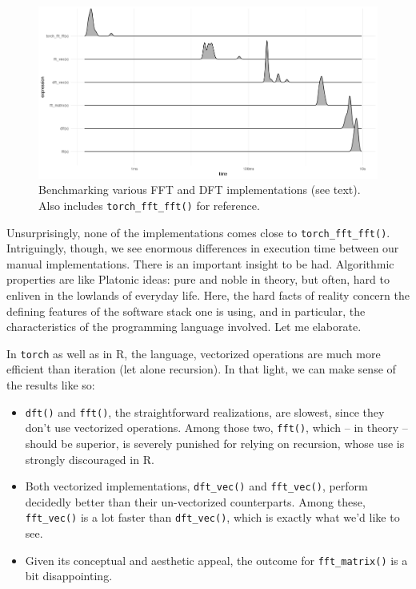 \documentclass[
  letterpaper,
]{krantz}
\providecommand{\tightlist}{%
  \setlength{\itemsep}{0pt}\setlength{\parskip}{0pt}}\usepackage{longtable,booktabs,array}
\begin{document}
\begin{figure}[H]

{\centering \includegraphics{images/fft-perf.png}

}

\caption{\label{fig-fft-perf}Benchmarking various FFT and DFT
implementations (see text). Also includes \texttt{torch\_fft\_fft()} for
reference.}

\end{figure}

Unsurprisingly, none of the implementations comes close to
\texttt{torch\_fft\_fft()}. Intriguingly, though, we see enormous
differences in execution time between our manual implementations. There
is an important insight to be had. Algorithmic properties are like
Platonic ideas: pure and noble in theory, but often, hard to enliven in
the lowlands of everyday life. Here, the hard facts of reality concern
the defining features of the software stack one is using, and in
particular, the characteristics of the programming language involved.
Let me elaborate.

In \texttt{torch} as well as in R, the language, vectorized operations
are much more efficient than iteration (let alone recursion). In that
light, we can make sense of the results like so:

\begin{itemize}
\tightlist
\item
  \texttt{dft()} and \texttt{fft()}, the straightforward realizations,
  are slowest, since they don't use vectorized operations. Among those
  two, \texttt{fft()}, which -- in theory -- should be superior, is
  severely punished for relying on recursion, whose use is strongly
  discouraged in R.
\item
  Both vectorized implementations, \texttt{dft\_vec()} and
  \texttt{fft\_vec()}, perform decidedly better than their un-vectorized
  counterparts. Among these, \texttt{fft\_vec()} is a lot faster than
  \texttt{dft\_vec()}, which is exactly what we'd like to see.
\item
  Given its conceptual and aesthetic appeal, the outcome for
  \texttt{fft\_matrix()} is a bit disappointing.
\end{itemize}
\end{document}
